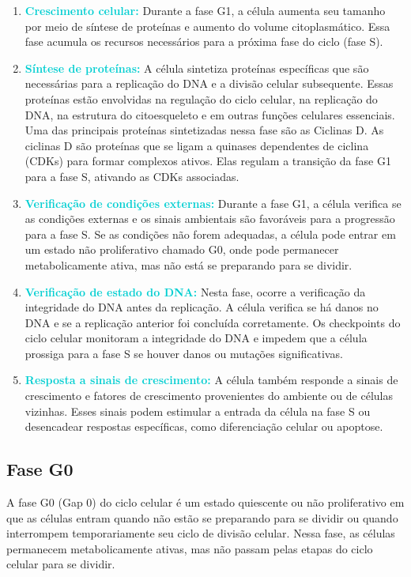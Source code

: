 \documentclass[11pt,a4paper]{article}
\begin{document}
	\begin{enumerate}
		\item \textcolor{DarkTurquoise}{\textbf{Crescimento celular:}} Durante a fase G1, a célula aumenta seu tamanho por meio de síntese de proteínas e aumento do volume citoplasmático. Essa fase acumula os recursos necessários para a próxima fase do ciclo (fase S).
		\item \textcolor{DarkTurquoise}{\textbf{Síntese de proteínas:}} A célula sintetiza proteínas específicas que são necessárias para a replicação do DNA e a divisão celular subsequente. Essas proteínas estão envolvidas na regulação do ciclo celular, na replicação do DNA, na estrutura do citoesqueleto e em outras funções celulares essenciais. Uma das principais proteínas sintetizadas nessa fase são as Ciclinas D. As ciclinas D são proteínas que se ligam a quinases dependentes de ciclina (CDKs) para formar complexos ativos. Elas regulam a transição da fase G1 para a fase S, ativando as CDKs associadas.
		\item \textcolor{DarkTurquoise}{\textbf{Verificação de condições externas:}} Durante a fase G1, a célula verifica se as condições externas e os sinais ambientais são favoráveis para a progressão para a fase S. Se as condições não forem adequadas, a célula pode entrar em um estado não proliferativo chamado G0, onde pode permanecer metabolicamente ativa, mas não está se preparando para se dividir.
		\item \textcolor{DarkTurquoise}{\textbf{Verificação de estado do DNA:}}  Nesta fase, ocorre a verificação da integridade do DNA antes da replicação. A célula verifica se há danos no DNA e se a replicação anterior foi concluída corretamente. Os checkpoints do ciclo celular monitoram a integridade do DNA e impedem que a célula prossiga para a fase S se houver danos ou mutações significativas.
		\item \textcolor{DarkTurquoise}{\textbf{Resposta a sinais de crescimento:}} A célula também responde a sinais de crescimento e fatores de crescimento provenientes do ambiente ou de células vizinhas. Esses sinais podem estimular a entrada da célula na fase S ou desencadear respostas específicas, como diferenciação celular ou apoptose.
	\end{enumerate}

	\subsection{Fase G0}

	A fase G0 (Gap 0) do ciclo celular é um estado quiescente ou não proliferativo em que as células entram quando não estão se preparando para se dividir ou quando interrompem temporariamente seu ciclo de divisão celular. Nessa fase, as células permanecem metabolicamente ativas, mas não passam pelas etapas do ciclo celular para se dividir.
\end{document}
